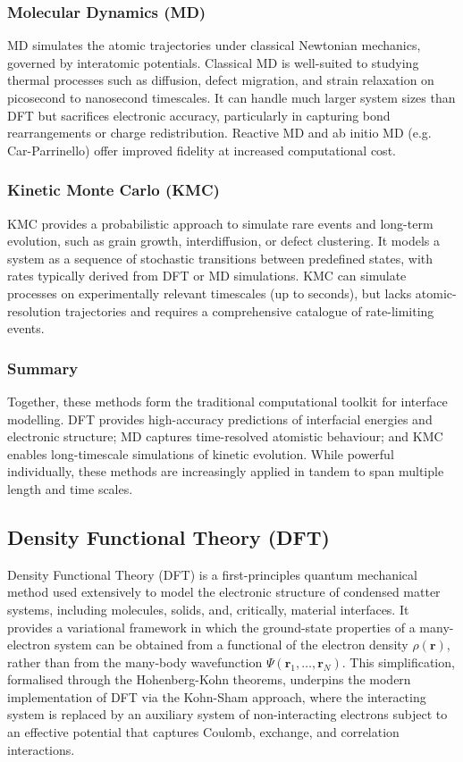 \subsubsection{Molecular Dynamics (MD)}

MD simulates the atomic trajectories under classical Newtonian mechanics, governed by interatomic potentials. Classical MD is well-suited to studying thermal processes such as diffusion, defect migration, and strain relaxation on picosecond to nanosecond timescales. It can handle much larger system sizes than DFT but sacrifices electronic accuracy, particularly in capturing bond rearrangements or charge redistribution. Reactive MD and ab initio MD (e.g. Car-Parrinello) offer improved fidelity at increased computational cost.

\subsubsection{Kinetic Monte Carlo (KMC)}

KMC provides a probabilistic approach to simulate rare events and long-term evolution, such as grain growth, interdiffusion, or defect clustering. It models a system as a sequence of stochastic transitions between predefined states, with rates typically derived from DFT or MD simulations. KMC can simulate processes on experimentally relevant timescales (up to seconds), but lacks atomic-resolution trajectories and requires a comprehensive catalogue of rate-limiting events.

\subsubsection{Summary}

Together, these methods form the traditional computational toolkit for interface modelling. DFT provides high-accuracy predictions of interfacial energies and electronic structure; MD captures time-resolved atomistic behaviour; and KMC enables long-timescale simulations of kinetic evolution. While powerful individually, these methods are increasingly applied in tandem to span multiple length and time scales.

\subsection{Density Functional Theory (DFT)}

Density Functional Theory (DFT) is a first-principles quantum mechanical method used extensively to model the electronic structure of condensed matter systems, including molecules, solids, and, critically, material interfaces. It provides a variational framework in which the ground-state properties of a many-electron system can be obtained from a functional of the electron density $\rho(\mathbf{r})$, rather than from the many-body wavefunction $\Psi(\mathbf{r}_1, \dots, \mathbf{r}_N)$. This simplification, formalised through the Hohenberg-Kohn theorems, underpins the modern implementation of DFT via the Kohn-Sham approach, where the interacting system is replaced by an auxiliary system of non-interacting electrons subject to an effective potential that captures Coulomb, exchange, and correlation interactions.

